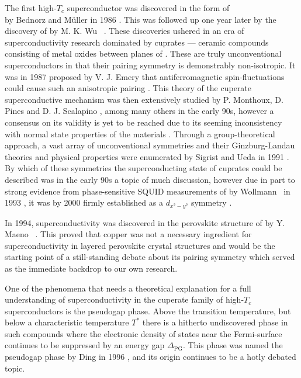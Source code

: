 The first high-$T_c$ superconductor was discovered in the form of\\  by Bednorz and M\"uller in 1986 \cite{Bednorz86}.
This was followed up one
year later by the discovery of  by M. K. Wu \etal\ \cite{Wu87}. These discoveries ushered in an era of superconductivity
research dominated by cuprates --- ceramic compounds consisting of metal oxides between planes of . These are truly unconventional
superconductors in that their pairing symmetry is demonstrably non-isotropic. It was in 1987 proposed by V. J. Emery that antiferromagnetic spin-fluctuations
could cause such an anisotropic pairing \cite{Emery87}. This theory of the cuperate superconductive mechanism was then extensively studied
by P. Monthoux, D. Pines and D. J. Scalapino \cite{Monthoux91, Monthoux92, Monthoux94}, among many others in the early 90s, however
a consensus on its validity is yet to be reached due to its seeming inconsistency with normal state properties of the materials \cite{Keimer15}.
Through a group-theoretical approach, a vast array
of unconventional symmetries and their Ginzburg-Landau theories and physical properties were enumerated by Sigrist and Ueda in 1991 \cite{SigristUeda91}.
By which of these symmetries the superconducting state of cuprates could be described was in the early 90s a topic of much discussion, however
due in part to strong evidence from phase-sensitive SQUID measurements of  by Wollmann \etal\ in 1993 \cite{Wollman93},
it was by 2000 firmly established as a $d_{x^2-y^2}$ symmetry \cite{Tsuei00}.

In 1994, superconductivity was discovered in the perovskite structure of  by Y. Maeno \etal\ \cite{Maeno94}. This proved that copper
was not a necessary ingredient for superconductivity in layered perovskite crystal structures and would be the starting point of a still-standing
debate about its pairing symmetry which served as the immediate backdrop to our own research.

One of the phenomena that needs a theoretical explanation for a full understanding of superconductivity in the cuperate family of high-$T_c$ superconductors
is the pseudogap phase. Above the transition temperature, but below a characteristic temperature $T^\ast$ there is a hitherto undiscovered phase in such compounds where the electronic density of
states near the Fermi-surface continues to be suppressed by an energy gap $\Delta_\text{PG}$. This phase was named the pseudogap phase by Ding \etal
in 1996 \cite{Ding96}, and its origin continues to be a hotly debated topic.

